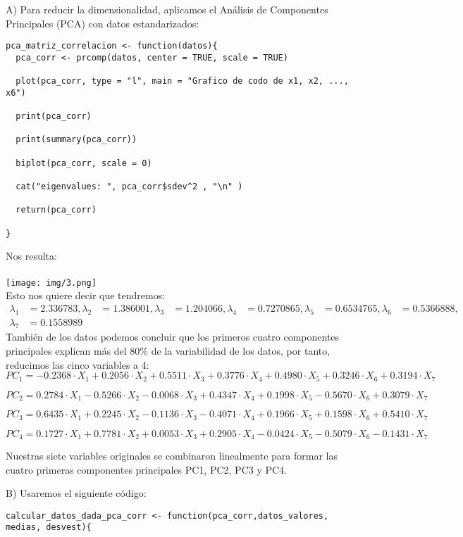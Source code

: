 \begin{sol}
A) Para reducir la dimensionalidad, aplicamos el Análisis de Componentes Principales (PCA) con datos estandarizados:
\begin{verbatim}
pca_matriz_correlacion <- function(datos){
  pca_corr <- prcomp(datos, center = TRUE, scale = TRUE)

  plot(pca_corr, type = "l", main = "Grafico de codo de x1, x2, ..., x6")

  print(pca_corr)

  print(summary(pca_corr))

  biplot(pca_corr, scale = 0)

  cat("eigenvalues: ", pca_corr$sdev^2 , "\n" )

  return(pca_corr)

}
\end{verbatim}
Nos resulta:\\\\
\texttt{[image: img/3.png]}\\
Esto nos quiere decir que tendremos:
\begin{align*}
\lambda_1 &= 2.336783,
\lambda_2 &= 1.386001,
\lambda_3 &= 1.204066, 
\lambda_4 &= 0.7270865, 
\lambda_5 &= 0.6534765, 
\lambda_6 &= 0.5366888, \\
\lambda_7 &= 0.1558989
\end{align*}
También de los datos podemos concluir que los primeros cuatro componentes principales explican más del 80\% de la variabilidad de los datos, por tanto, reducimos las cinco variables a 4:
\[
PC_1 = -0.2368 \cdot X_1 + 0.2056 \cdot X_2 + 0.5511 \cdot X_3 + 0.3776 \cdot X_4 + 0.4980 \cdot X_5 + 0.3246 \cdot X_6 + 0.3194 \cdot X_7
\]

\[
PC_2 = 0.2784 \cdot X_1 - 0.5266 \cdot X_2 - 0.0068 \cdot X_3 + 0.4347 \cdot X_4 + 0.1998 \cdot X_5 - 0.5670 \cdot X_6 + 0.3079 \cdot X_7
\]

\[
PC_3 = 0.6435 \cdot X_1 + 0.2245 \cdot X_2 - 0.1136 \cdot X_3 - 0.4071 \cdot X_4 + 0.1966 \cdot X_5 + 0.1598 \cdot X_6 + 0.5410 \cdot X_7
\]

\[
PC_4 = 0.1727 \cdot X_1 + 0.7781 \cdot X_2 + 0.0053 \cdot X_3 + 0.2905 \cdot X_4 - 0.0424 \cdot X_5 - 0.5079 \cdot X_6 - 0.1431 \cdot X_7
\]

Nuestras siete variables originales se combinaron linealmente para formar las cuatro primeras componentes principales PC1, PC2, PC3 y PC4.

\pagebreak

B) Usaremos el siguiente código: 
\begin{verbatim}
calcular_datos_dada_pca_corr <- function(pca_corr,datos_valores, medias, desvest){


\end{verbatim}
\end{sol}
